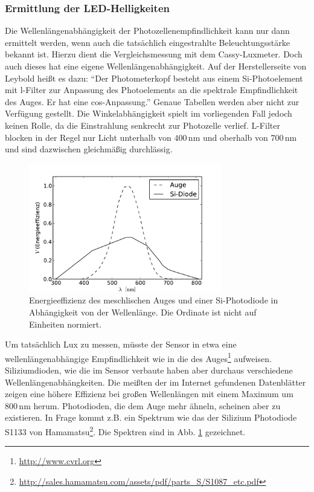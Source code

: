 \documentclass[11pt]{scrartcl}
\newcommand{\unit}[1]{\ensuremath{\,\mathrm{#1}}} %
\begin{document}
\subsubsection{Ermittlung der LED-Helligkeiten}
Die Wellenlängenabhängigkeit der Photozellenempfindlichkeit kann nur dann ermittelt werden, wenn auch die tatsächlich eingestrahlte Beleuchtungsstärke bekannt ist. Hierzu dient die Vergleichsmessung mit dem Cassy-Luxmeter. Doch auch dieses hat eine eigene Wellenlängenabhängigkeit. Auf der Herstellerseite von Leybold heißt es dazu: "`Der Photometerkopf besteht aus einem Si-Photoelement mit l-Filter zur Anpassung des Photoelements an die spektrale Empfindlichkeit des Auges. Er hat eine cos-Anpassung."' Genaue Tabellen werden aber nicht zur Verfügung gestellt. Die Winkelabhängigkeit spielt im vorliegenden Fall jedoch keinen Rolle, da die Einstrahlung senkrecht zur Photozelle verlief. L-Filter blocken in der Regel nur Licht unterhalb von $400\unit{nm}$ und oberhalb von $700\unit{nm}$ und sind dazwischen gleichmäßig durchlässig.
\begin{figure}[ht]
\begin{center}
\includegraphics[width=0.75\textwidth]{images/lichteffizienz_silizium_auge.pdf}
\end{center}
\vspace{-1.5\baselineskip}
\caption{Energieeffizienz des meschlischen Auges und einer Si-Photodiode in Abhängigkeit von der Wellenlänge. Die Ordinate ist nicht auf Einheiten normiert.}
\label{lichteffizienz_auge}
\end{figure}
Um tatsächlich Lux zu messen, müsste der Sensor in etwa eine wellenlängenabhängige Empfindlichkeit wie in die des Auges\footnote{\url{http://www.cvrl.org}} aufweisen. Siliziumdioden, wie die im Sensor verbaute haben aber durchaus verschiedene Wellenlängenabhängkeiten. Die meißten der im Internet gefundenen Datenblätter zeigen eine höhere Effizienz bei großen Wellenlängen mit einem Maximum um $800\unit{nm}$ herum. Photodioden, die dem Auge mehr ähneln, scheinen aber zu existieren. In Frage kommt z.B. ein Spektrum wie das der Silizium Photodiode S1133 von Hamamatsu\footnote{\url{http://sales.hamamatsu.com/assets/pdf/parts_S/S1087_etc.pdf}}. Die Spektren sind in Abb. \ref{lichteffizienz_auge} gezeichnet.
\end{document}
